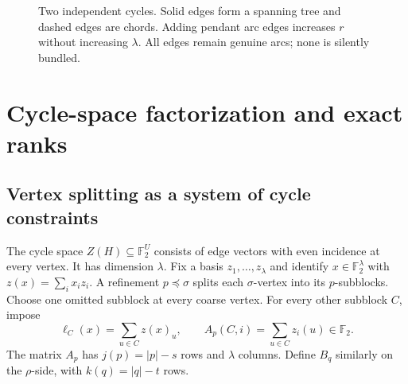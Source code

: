 \documentclass[11pt,a4paper]{article}
\theoremstyle{definition}
\theoremstyle{remark}
\newcommand{\F}{\mathbb F_2}
\begin{document}
\begin{figure}[htbp]
\centering
{}
\caption{Two independent cycles. Solid edges form a spanning tree and dashed edges are
chords. Adding pendant arc edges increases $r$ without increasing $\lambda$. All edges
remain genuine arcs; none is silently bundled.}\label{fig:envelope}
\end{figure}

\section{Cycle-space factorization and exact ranks}\label{sec:rank}
\subsection{Vertex splitting as a system of cycle constraints}
The cycle space $Z(H)\subseteq\F^U$ consists of edge vectors with even incidence at
every vertex. It has dimension $\lambda$. Fix a basis $z_1,\ldots,z_\lambda$ and
identify $x\in\F^\lambda$ with $z(x)=\sum_i x_i z_i$.
A refinement $p\preceq\sigma$ splits each $\sigma$-vertex into its $p$-subblocks.
Choose one omitted subblock at every coarse vertex. For every other subblock $C$, impose
\begin{equation}
 \ell_C(x)=\sum_{u\in C}z(x)_u,\qquad
 A_p(C,i)=\sum_{u\in C}z_i(u)\in\F.
 \label{eq:constraints}
\end{equation}
The matrix $A_p$ has $j(p)=|p|-s$ rows and $\lambda$ columns.
Define $B_q$ similarly on the $\rho$-side, with $k(q)=|q|-t$ rows.
\end{document}
